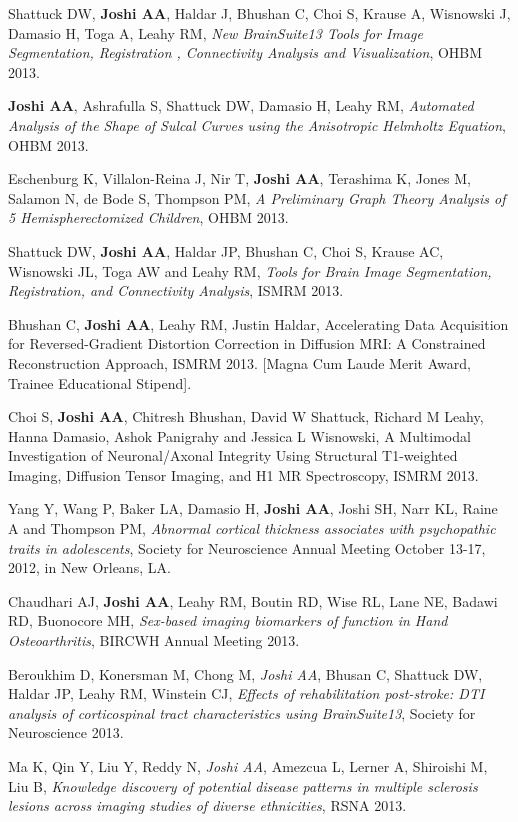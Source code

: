 \documentclass[overlapped,line,letterpaper]{res}
\begin{document}
\begin{resume}
Shattuck DW, \textbf{Joshi AA}, Haldar J, Bhushan C, Choi S, Krause A, Wisnowski J, Damasio H, Toga A, Leahy RM, \textit{New BrainSuite13 Tools for Image Segmentation, Registration , Connectivity Analysis and Visualization}, OHBM 2013.

\textbf{Joshi AA}, Ashrafulla S, Shattuck DW, Damasio H, Leahy RM, \textit{Automated Analysis of the Shape of Sulcal Curves using the Anisotropic Helmholtz Equation}, OHBM 2013.

Eschenburg K, Villalon-Reina J, Nir T, \textbf{Joshi AA}, Terashima K, Jones M, Salamon N, de Bode S, Thompson PM, \textit{A Preliminary Graph Theory Analysis of 5 Hemispherectomized Children}, OHBM 2013.

Shattuck DW, \textbf{Joshi AA}, Haldar JP, Bhushan C, Choi S, Krause AC, Wisnowski JL, Toga AW and Leahy RM, \textit{Tools for Brain Image Segmentation, Registration, and Connectivity Analysis}, ISMRM 2013. 

Bhushan C, \textbf{Joshi AA}, Leahy RM, Justin Haldar, Accelerating Data Acquisition for Reversed-Gradient Distortion Correction in Diffusion MRI: A Constrained Reconstruction Approach, ISMRM 2013. [Magna Cum Laude Merit Award, Trainee Educational Stipend].

Choi S, \textbf{Joshi AA}, Chitresh Bhushan, David W Shattuck, Richard M Leahy, Hanna Damasio, Ashok Panigrahy and Jessica L Wisnowski, A Multimodal Investigation of Neuronal/Axonal Integrity Using Structural T1-weighted Imaging, Diffusion Tensor Imaging, and H1 MR Spectroscopy, ISMRM 2013.

Yang Y, Wang P, Baker LA, Damasio H, \textbf{Joshi AA}, Joshi SH, Narr KL, Raine A and Thompson PM, \textit{Abnormal cortical thickness associates with psychopathic traits in adolescents}, Society for Neuroscience Annual Meeting October 13-17, 2012, in New Orleans, LA.

Chaudhari AJ, \textbf{Joshi AA}, Leahy RM, Boutin RD, Wise RL, Lane NE, Badawi RD, Buonocore MH, \textit{Sex-based imaging biomarkers of function in Hand Osteoarthritis}, BIRCWH Annual Meeting 2013.

Beroukhim D, Konersman M, Chong M, \textit{Joshi AA}, Bhusan C, Shattuck DW, Haldar JP, Leahy RM, Winstein CJ, \textit{Effects of rehabilitation post-stroke: DTI analysis of corticospinal tract characteristics using BrainSuite13}, Society for Neuroscience 2013.

Ma K, Qin Y, Liu Y, Reddy N, \textit{Joshi AA}, Amezcua L, Lerner A, Shiroishi M, Liu B, \textit{Knowledge discovery of potential disease patterns in multiple sclerosis lesions across imaging studies of diverse ethnicities}, RSNA 2013.


\end{resume}
\end{document}
